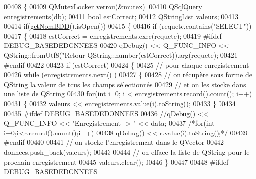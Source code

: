 \begin{DoxyCode}
00408 \{
00409     QMutexLocker verrou(&\hyperlink{class_base_de_donnees_aa1b4696fac87a740f914aa73739086f2}{mutex});
00410     QSqlQuery enregistrements(\hyperlink{class_base_de_donnees_a3e738dcf443370c46a541677ab619f06}{db});
00411     \textcolor{keywordtype}{bool} estCorrect;
00412     QStringList valeurs;
00413 
00414     \textcolor{keywordflow}{if}(\hyperlink{class_base_de_donnees_a467909531ae3cdebaf173f6e97cdc624}{getNomBDD}().isOpen())
00415     \{
00416         \textcolor{keywordflow}{if} (requete.contains(\textcolor{stringliteral}{"SELECT"}))
00417         \{
00418             estCorrect = enregistrements.exec(requete);
00419 \textcolor{preprocessor}{            #ifdef DEBUG\_BASEDEDONNEES}
00420             qDebug() << Q\_FUNC\_INFO << QString::fromUtf8(\textcolor{stringliteral}{"Retour %
      QString::number(estCorrect)).arg(requete);
00421 \textcolor{preprocessor}{            #endif}
00422 
00423             \textcolor{keywordflow}{if} (estCorrect)
00424             \{
00425                 \textcolor{comment}{// pour chaque enregistrement}
00426                 \textcolor{keywordflow}{while} (enregistrements.next() )
00427                 \{
00428                     \textcolor{comment}{// on récupère sous forme de QString la valeur de tous les champs sélectionnés}
00429                     \textcolor{comment}{// et on les stocke dans une liste de QString}
00430                     \textcolor{keywordflow}{for}(\textcolor{keywordtype}{int} i=0; i < enregistrements.record().count(); i++)
00431                     \{
00432                         valeurs << enregistrements.value(i).toString();
00433                     \}
00434 
00435 \textcolor{preprocessor}{                    #ifdef DEBUG\_BASEDEDONNEES}
00436                     \textcolor{comment}{//qDebug() << Q\_FUNC\_INFO << "Enregistrement -> " << data;}
00437                     \textcolor{comment}{/*for(int i=0;i<r.record().count();i++)}
00438 \textcolor{comment}{                        qDebug() << r.value(i).toString();*/}
00439 \textcolor{preprocessor}{                    #endif}
00440 
00441                     \textcolor{comment}{// on stocke l'enregistrement dans le QVector}
00442                     donnees.push\_back(valeurs);
00443 
00444                     \textcolor{comment}{// on efface la liste de QString pour le prochain enregistrement}
00445                     valeurs.clear();
00446                 \}
00447 
00448 \textcolor{preprocessor}{                #ifdef DEBUG\_BASEDEDONNEES}
}
\end{DoxyCode}
